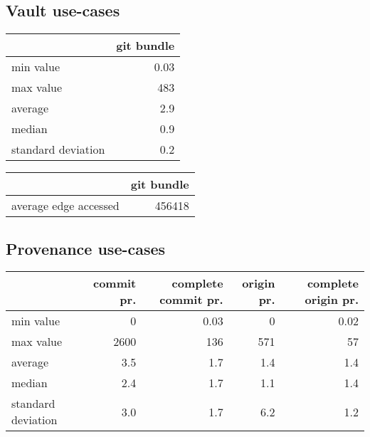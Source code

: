 \documentclass[11pt,a4paper]{article}
\begin{document}
\newpage

\subsection{Vault use-cases}

\begin{center}
    \begin{tabular}{@{} l r @{}}
        \toprule
        \multicolumn{1}{c}{} &
            \textbf{git bundle} \\
        \midrule
        min value & 0.03 \\
        max value & 483 \\
        average & 2.9 \\
        median & 0.9 \\
        standard deviation & 0.2 \\
        \bottomrule
    \end{tabular}
\end{center}

\vspace{0.5cm}

\begin{center}
    \begin{tabular}{@{} l r @{}}
        \toprule
        \multicolumn{1}{c}{} &
            \textbf{git bundle} \\
        \midrule
        average edge accessed & 456418 \\
        \bottomrule
    \end{tabular}
\end{center}

\subsection{Provenance use-cases}

\begin{center}
    \begin{tabular}{@{} l *4r @{}}
        \toprule
        \multicolumn{1}{c}{} &
            \textbf{commit pr.} &
            \textbf{complete commit pr.} &
            \textbf{origin pr.} &
            \textbf{complete origin pr.} \\
        \midrule
        min value & 0 & 0.03 & 0 & 0.02 \\
        max value & 2600 & 136 & 571 & 57 \\
        average & 3.5 & 1.7 & 1.4 & 1.4 \\
        median & 2.4 & 1.7 & 1.1 & 1.4 \\
        standard deviation & 3.0 & 1.7 & 6.2 & 1.2 \\
        \bottomrule
    \end{tabular}
\end{center}
\end{document}
